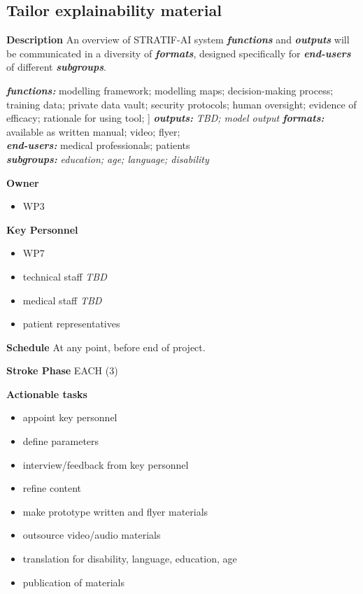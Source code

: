 \documentclass[
  letterpaper,
  DIV=11,
  numbers=noendperiod]{scrreport}
\providecommand{\tightlist}{%
  \setlength{\itemsep}{0pt}\setlength{\parskip}{0pt}}\usepackage{longtable,booktabs,array}
\begin{document}
\hypertarget{tailor-explainability-material}{%
\subsection{Tailor explainability
material}\label{tailor-explainability-material}}

\textbf{Description} An overview of STRATIF-AI system
\textbf{\emph{functions}} and \textbf{\emph{outputs}} will be
communicated in a diversity of \textbf{\emph{formats}}, designed
specifically for \textbf{\emph{end-users}} of different
\textbf{\emph{subgroups}}.

\textbf{\emph{functions:}} modelling framework; modelling maps;
decision-making process; training data; private data vault; security
protocols; human oversight; evidence of efficacy; rationale for using
tool; {]} \textbf{\emph{outputs:}} \emph{TBD; model output}
\textbf{\emph{formats:}} available as written manual; video; flyer;\\
\textbf{\emph{end-users:}} medical professionals; patients\\
\textbf{\emph{subgroups:}} \emph{education; age; language; disability}

\textbf{Owner}

\begin{itemize}
\tightlist
\item
  WP3
\end{itemize}

\textbf{Key Personnel}

\begin{itemize}
\tightlist
\item
  WP7
\item
  technical staff \emph{TBD}
\item
  medical staff \emph{TBD}
\item
  patient representatives
\end{itemize}

\textbf{Schedule} At any point, before end of project.

\textbf{Stroke Phase} EACH (3)

\textbf{Actionable tasks}

\begin{itemize}
\tightlist
\item
  appoint key personnel
\item
  define parameters
\item
  interview/feedback from key personnel
\item
  refine content
\item
  make prototype written and flyer materials
\item
  outsource video/audio materials
\item
  translation for disability, language, education, age
\item
  publication of materials
\end{itemize}
\end{document}
